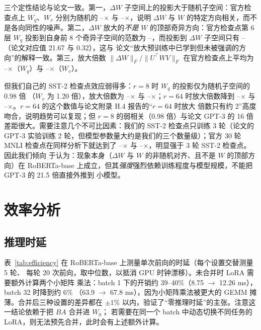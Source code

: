 \documentclass[11pt,a4paper]{ctexart}
\providecommand{\AmpQ}{--}\providecommand{\AmpV}{--}\providecommand{\LoraPeakMem}{--}
\providecommand{\AmpQB}{--}\providecommand{\AmpVB}{--}\providecommand{\PhiQ}{--}
\providecommand{\OffProjAmpQ}{--}\providecommand{\OffProjAmpV}{--}\providecommand{\OffProjRatioQ}{--}
\providecommand{\OffProjRatioV}{--}\providecommand{\OffProjWQ}{--}\providecommand{\OffProjDWQ}{--}
\begin{document}
\begin{table}[H]
\centering
\caption{第 6 层冻结权重在 $\Delta W$ 子空间与随机子空间上的投影范数（SST-2 检查点）。}
\label{tab:analysis}
\small

\end{table}

\begin{table}[H]
\centering
\caption{官方 RoBERTa-base MNLI LoRA 检查点（$\alpha=16$）上 12 层的平均投影范数。}
\label{tab:official-proj}
\small

\end{table}

三个定性结论与论文一致。第一，$\Delta W$ 子空间上的投影大于随机子空间：官方检查点上
$W_q$、$W_v$ 分别为随机的 \OffProjRatioQ$\times$ 与 \OffProjRatioV$\times$，说明
$\Delta W$ 与 $W$ 的特定方向相关，而不是各向同性的噪声。第二，$\Delta W$ 放大的\emph{不是}
$W$ 的顶部奇异方向：官方检查点第 6 层 $W_q$ 投影到自身前 8 个奇异子空间的范数为
\OffProjWQ，而投影到 $\Delta W$ 子空间只有 \OffProjDWQ（论文对应值 21.67 与 0.32），这与
论文“放大预训练中已学到但未被强调的方向”的解释一致。第三，放大倍数
$\lVert\Delta W\rVert_F/\lVert U^\top W V\rVert_F$ 在官方检查点上平均为
\OffProjAmpQ$\times$（$W_q$）与 \OffProjAmpV$\times$（$W_v$）。

但我们自己的 SST-2 检查点效应弱得多：$r=8$ 时 $W_q$ 的投影仅为随机子空间的 0.98 倍
（$W_v$ 为 1.20 倍），放大倍数为 \AmpQ$\times$ 与 \AmpV$\times$；$r=64$ 时放大倍数降到
\AmpQB$\times$ 与 \AmpVB$\times$。$r=64$ 的这个数值与论文附录 H.4 报告的“$r=64$ 时放大
倍数只有约 2”高度吻合，说明趋势可以复现；但 $r=8$ 的弱相关（0.98 倍）与论文 GPT-3 的
16 倍差距很大。需要注意几个不可比因素：我们的 SST-2 检查点只训练 3 轮（论文的 GPT-3
实验训练 2 轮，但模型参数量大约是我们的三个数量级）；官方 30 轮 MNLI 检查点在同样分析下就达到了
\OffProjRatioQ$\times$ 与 \OffProjAmpQ$\times$，明显强于 3 轮 SST-2 检查点。因此我们倾向
于认为：现象本身（$\Delta W$ 与 $W$ 的非随机对齐、且不是 $W$ 的顶部方向）在 RoBERTa-base
上成立，但其\emph{强度}强烈依赖训练程度与模型规模，不能把 GPT-3 的 21.5 倍直接外推到
小模型。

\section{效率分析}
\label{sec:efficiency}
\subsection{推理时延}
表~\ref{tab:efficiency} 在 RoBERTa-base 上测量单次前向的时延（每个设置交替测量 5 轮、
每轮 20 次前向，取中位数，以抵消 GPU 时钟漂移）。未合并时 LoRA 需要额外计算两个小矩阵
乘法：batch 1 下的开销约 39--40\%（8.75 $\to$ 12.26 ms），batch 32 时降到约 6\%
（63.9 $\to$ 67.8 ms），因为小矩阵乘法被更大的 GEMM 摊薄。合并后三种设置的差异都在
$\pm1\%$ 以内，验证了“零推理时延”的主张。注意这一结论依赖于把 $BA$ 合并进 $W_0$；
若需要在同一个 batch 中动态切换不同任务的 LoRA，则无法预先合并，此时会有上述额外计算。
\end{document}

